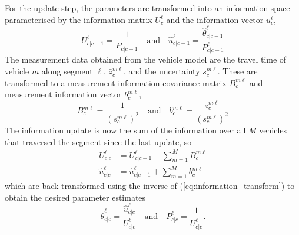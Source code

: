 For the update step, the parameters are transformed into an information
space parameterised by the information matrix $U^\ell_c$
and the information vector $u^\ell_c$,
\begin{equation}
\label{eq:information_transform}
U^\ell_{c|c-1} = \frac{1}{P_{c|c-1}}
\quad\text{and}\quad
\hat u^\ell_{c|c-1} = \frac{\hat \theta^\ell_{c|c-1}}{P^\ell_{c|c-1}}
\end{equation}
The measurement data obtained from the vehicle model are
the travel time of vehicle $m$ along segment $\ell$,
$\bar z_c^{m\ell}$, and the uncertainty $s^{m\ell}_c$.
These are transformed to a measurement information covariance matrix $B_c^{m\ell}$
and measurement information vector $b_c^{m\ell}$,
\begin{equation*}
B^{m\ell}_c = \frac{1}{(s^{m\ell}_c)^{2}}\quad\text{and}\quad
b^{m\ell}_c = \frac{\bar z^{m\ell}_c}{(s^{m\ell}_c)^2}
\end{equation*}
The information update is now the sum of the information over all $M$ vehicles
that traversed the segment since the last update, so
\begin{align*}
U^\ell_{c|c} &= U^\ell_{c|c-1} + \sum_{m=1}^M B^{m\ell}_{c} \\
\hat u^\ell_{c|c} &= \hat u^\ell_{c|c-1} + \sum_{m=1}^M b^{m\ell}_{c}
\end{align*}
which are back transformed
using the inverse of (\ref{eq:information_transform})
to obtain the desired parameter estimates
\begin{equation*}
\hat \theta^\ell_{c|c} = \frac{\hat u^\ell_{c|c}}{U^\ell_{c|c}} 
\quad\text{and}\quad
P^\ell_{c|c} = \frac{1}{U^\ell_{c|c}}.
\end{equation*}



